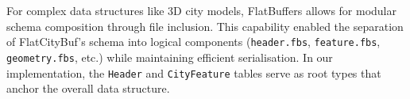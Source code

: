 For complex data structures like 3D city models, FlatBuffers allows for modular schema composition through file inclusion. This capability enabled the separation of FlatCityBuf's schema into logical components (\texttt{header.fbs}, \texttt{feature.fbs}, \texttt{geometry.fbs}, etc.) while maintaining efficient serialisation. In our implementation, the \texttt{Header} and \texttt{CityFeature} tables serve as root types that anchor the overall data structure.
